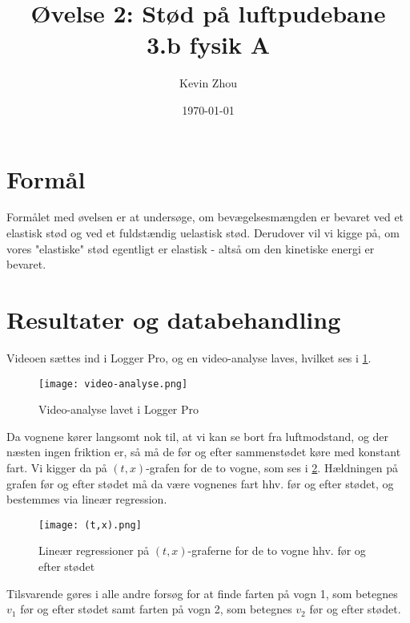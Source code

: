 \documentclass{report}
\title{Øvelse 2: Stød på luftpudebane\\
{\Large \textbf{3.b fysik A}}}
\author{Kevin Zhou}
\date{\today}
\begin{document}
\maketitle
\section*{Formål}
Formålet med øvelsen er at undersøge, om bevægelsesmængden er bevaret ved et elastisk stød og ved et fuldstændig uelastisk stød.
Derudover vil vi kigge på, om vores "elastiske" stød egentligt er elastisk - altså om den kinetiske energi er bevaret.
\section*{Resultater og databehandling}
Videoen sættes ind i Logger Pro, og en video-analyse laves, hvilket ses i \cref{fig:video}.
\begin{figure}[H]
\begin{center}
  \texttt{[image: video-analyse.png]}
\end{center}
\caption{Video-analyse lavet i Logger Pro}
\label{fig:video}
\end{figure}
Da vognene kører langsomt nok til, at vi kan se bort fra luftmodstand, og der næsten ingen friktion er, så må de før og efter sammenstødet køre med konstant fart.
Vi kigger da på $(t,x)$-grafen for de to vogne, som ses i \cref{fig:tx}.
Hældningen på grafen før og efter stødet må da være vognenes fart hhv. før og efter stødet, og bestemmes via lineær regression.
\begin{figure}[H]
\begin{center}
  \texttt{[image: (t,x).png]}
\end{center}
  \caption{Lineær regressioner på $(t,x)$-graferne for de to vogne hhv. før og efter stødet}
\label{fig:tx}
\end{figure}
Tilsvarende gøres i alle andre forsøg for at finde farten på vogn 1, som betegnes $v_1$ før og efter stødet samt farten på vogn 2, som betegnes $v_2$ før og efter stødet. 
\end{document}
